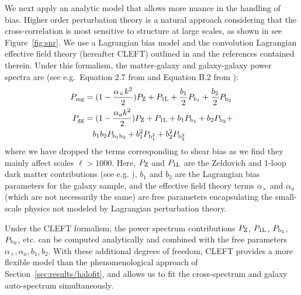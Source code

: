 We next apply an analytic model that allows more nuance in the handling of bias. Higher order perturbation theory is a natural approach considering that the cross-correlation is most sensitive to structure at large scales, as shown in see Figure~\ref{fig:snr}. We use a Lagrangian bias model and the convolution Lagrangian effective field theory (hereafter CLEFT) outlined in \citealt{Vlah++16} and the references contained therein. Under this formalism, the matter-galaxy and galaxy-galaxy power spectra are (see e.g.\ Equation 2.7 from \citealt{Modi++17} and Equation B.2 from \citealt{Vlah++16}):
\begin{align}\label{eqn:lpt1}
    P_{\rm mg} &= (1-\frac{\alpha_{\times}k^2}{2})P_{\rm Z} + P_{\rm 1L} + \frac{b_1}{2}P_{\rm b_1} + \frac{b_2}{2}P_{\rm b_2} \\
    \label{eqn:lpt2}
    P_{\rm gg} &= (1-\frac{\alpha_{a}k^2}{2})P_{\rm Z} + P_{\rm 1L} + b_1 P_{\rm b_1} + b_2 P_{\rm b_2} + \\
    & \hspace{0.35cm} b_1 b_2 P_{\rm b_1 b_2}  + b_1^2 P_{\rm b_1^2} + b_2^2 P_{\rm b_2^2} \nonumber
\end{align}
where we have dropped the terms corresponding to shear bias as we find they mainly affect scales $\ell > 1000$. Here, $P_{\rm Z}$ and $P_{\rm 1L}$ are the Zeldovich and 1-loop dark matter contributions (see e.g. \citealt{Vlah++15}), $b_1$ and $b_2$ are the Lagrangian bias parameters for the galaxy sample, and the effective field theory terms $\alpha_{\times}$ and $\alpha_a$ (which are not necessarily the same) are free parameters encapsulating the small-scale physics not modeled by Lagrangian perturbation theory.

Under the CLEFT formalism, the power spectrum contributions $P_{\rm Z}$, $P_{\rm 1L}$, $P_{\rm b_1}$, $P_{\rm b_2}$, etc. can be computed analytically and combined with the free parameters $\alpha_{\times}, \alpha_a, b_1, b_2$. With these additional degrees of freedom, CLEFT provides a more flexible model than the phenomenological approach of Section~\ref{sec:results/halofit}, and allows us to fit the cross-spectrum and galaxy auto-spectrum simultaneously.

